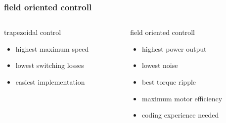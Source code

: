 \documentclass{beamer}
\begin{document}
\begin{frame}
  
  \frametitle{\bf field oriented controll}    



  \begin{columns}

    \begin{column}{0.5\textwidth}
      trapezoidal control
      \begin{itemize}
        \item highest maximum speed
        \item lowest switching losses
        \item easiest implementation
      \end{itemize}
    \end{column}

    \begin{column}{0.5\textwidth}
      field oriented controll
      \begin{itemize}
        \item highest power output
        \item lowest noise
        \item best torque ripple
        \item maximum motor efficiency
        \item coding experience needed
      \end{itemize}
    \end{column}

  \end{columns}
  
\end{frame}
\end{document}
